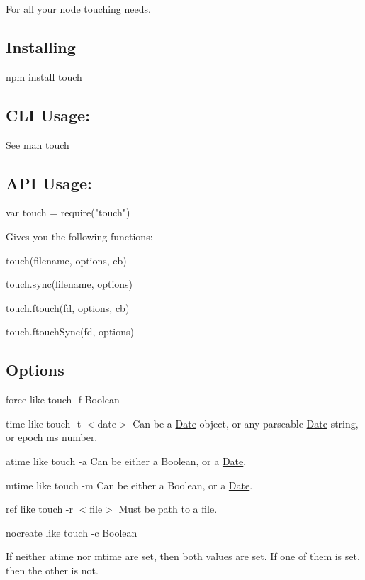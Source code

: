 For all your node touching needs.

\subsection*{Installing}


\begin{DoxyCode}
npm install touch
\end{DoxyCode}


\subsection*{C\+LI Usage\+:}

See {\ttfamily man touch}

\subsection*{A\+PI Usage\+:}


\begin{DoxyCode}
var touch = require("touch")
\end{DoxyCode}


Gives you the following functions\+:


\begin{DoxyItemize}
\item {\ttfamily touch(filename, options, cb)}
\item {\ttfamily touch.\+sync(filename, options)}
\item {\ttfamily touch.\+ftouch(fd, options, cb)}
\item {\ttfamily touch.\+ftouch\+Sync(fd, options)}
\end{DoxyItemize}

\subsection*{Options}


\begin{DoxyItemize}
\item {\ttfamily force} like {\ttfamily touch -\/f} Boolean
\item {\ttfamily time} like {\ttfamily touch -\/t $<$date$>$} Can be a \mbox{\hyperlink{classDate}{Date}} object, or any parseable \mbox{\hyperlink{classDate}{Date}} string, or epoch ms number.
\item {\ttfamily atime} like {\ttfamily touch -\/a} Can be either a Boolean, or a \mbox{\hyperlink{classDate}{Date}}.
\item {\ttfamily mtime} like {\ttfamily touch -\/m} Can be either a Boolean, or a \mbox{\hyperlink{classDate}{Date}}.
\item {\ttfamily ref} like {\ttfamily touch -\/r $<$file$>$} Must be path to a file.
\item {\ttfamily nocreate} like {\ttfamily touch -\/c} Boolean
\end{DoxyItemize}

If neither {\ttfamily atime} nor {\ttfamily mtime} are set, then both values are set. If one of them is set, then the other is not. 